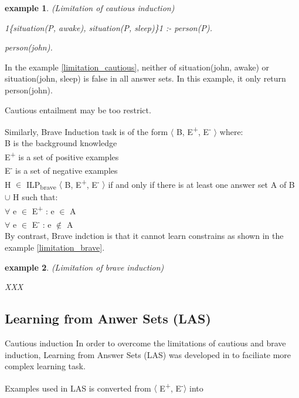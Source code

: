 \documentclass[12pt,twoside]{report}
\newtheorem{examp}{example}[section]
\begin{document}
\begin{examp} (Limitation of cautious induction)

1\{situation(P, awake), situation(P, sleep)\}1 :- person(P).

person(john).
\end{examp}
\label{limitation_cautious}

In the example \ref{limitation_cautious}, neither of situation(john, awake) or situation(john, sleep) is false in all answer sets. In this example, it only return person(john).

Cautious entailment may be too restrict.

Similarly, Brave Induction task is of the form $\langle$ B, E\textsuperscript{+}, E\textsuperscript{-} $\rangle$ where: \\
B is the background knowledge \\
E\textsuperscript{+} is a set of positive examples \\
E\textsuperscript{-} is a set of negative examples \\

 H $\in$ ILP\textsubscript{brave} $\langle$ B, E\textsuperscript{+}, E\textsuperscript{-} $\rangle$ if and only if there is at least one answer set A of B $\cup$ H such that: \\
$\forall$ e $\in$ E\textsuperscript{+} : e $\in$ A \\
$\forall$ e $\in$ E\textsuperscript{-} : e $\notin$ A \\


By contrast, Brave indction is that it cannot learn constrains as shown in the example \ref{limitation_brave}.

\begin{examp} (Limitation of brave induction)

XXX
\end{examp}
\label{limitation_brave}

\subsection{Learning from Anwer Sets (LAS)}

Cautious induction In order to overcome the limitations of cautious and brave induction,
Learning from Answer Sets (LAS) was developed in \cite{Law2014} to faciliate more complex learning task.

Examples used in LAS is converted from $\langle$ E\textsuperscript{+}, E\textsuperscript{-}$\rangle$ into
\end{document}
